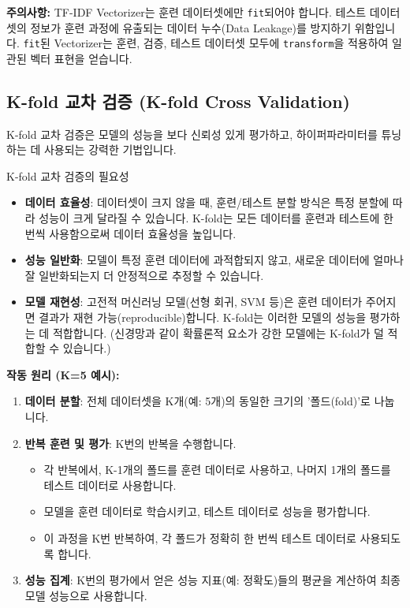 \documentclass[11pt,a4paper]{article}
\begin{document}
\textbf{주의사항:}
TF-IDF Vectorizer는 훈련 데이터셋에만 \texttt{fit}되어야 합니다. 테스트 데이터셋의 정보가 훈련 과정에 유출되는 데이터 누수(Data Leakage)를 방지하기 위함입니다. \texttt{fit}된 Vectorizer는 훈련, 검증, 테스트 데이터셋 모두에 \texttt{transform}을 적용하여 일관된 벡터 표현을 얻습니다.

\subsection{K-fold 교차 검증 (K-fold Cross Validation)}

K-fold 교차 검증은 모델의 성능을 보다 신뢰성 있게 평가하고, 하이퍼파라미터를 튜닝하는 데 사용되는 강력한 기법입니다.

\begin{summarybox}{K-fold 교차 검증의 필요성}
\begin{itemize}
    \item \textbf{데이터 효율성}: 데이터셋이 크지 않을 때, 훈련/테스트 분할 방식은 특정 분할에 따라 성능이 크게 달라질 수 있습니다. K-fold는 모든 데이터를 훈련과 테스트에 한 번씩 사용함으로써 데이터 효율성을 높입니다.
    \item \textbf{성능 일반화}: 모델이 특정 훈련 데이터에 과적합되지 않고, 새로운 데이터에 얼마나 잘 일반화되는지 더 안정적으로 추정할 수 있습니다.
    \item \textbf{모델 재현성}: 고전적 머신러닝 모델(선형 회귀, SVM 등)은 훈련 데이터가 주어지면 결과가 재현 가능(reproducible)합니다. K-fold는 이러한 모델의 성능을 평가하는 데 적합합니다. (신경망과 같이 확률론적 요소가 강한 모델에는 K-fold가 덜 적합할 수 있습니다.)
\end{itemize}
\end{summarybox}

\textbf{작동 원리 (K=5 예시):}
\begin{enumerate}
    \item \textbf{데이터 분할}: 전체 데이터셋을 K개(예: 5개)의 동일한 크기의 '폴드(fold)'로 나눕니다.
    \item \textbf{반복 훈련 및 평가}: K번의 반복을 수행합니다.
        \begin{itemize}
            \item 각 반복에서, K-1개의 폴드를 훈련 데이터로 사용하고, 나머지 1개의 폴드를 테스트 데이터로 사용합니다.
            \item 모델을 훈련 데이터로 학습시키고, 테스트 데이터로 성능을 평가합니다.
            \item 이 과정을 K번 반복하여, 각 폴드가 정확히 한 번씩 테스트 데이터로 사용되도록 합니다.
        \end{itemize}
    \item \textbf{성능 집계}: K번의 평가에서 얻은 성능 지표(예: 정확도)들의 평균을 계산하여 최종 모델 성능으로 사용합니다.
\end{enumerate}
\end{document}
